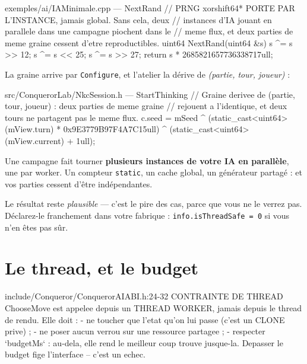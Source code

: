 \begin{nkcode}{exemples/ai/IAMinimale.cpp — NextRand}
// PRNG xorshift64* PORTE PAR L'INSTANCE, jamais global. Sans cela, deux
// instances d'IA jouant en parallele dans une campagne piochent dans le
// meme flux, et deux parties de meme graine cessent d'etre reproductibles.
uint64 NextRand(uint64 &s) {
    s ^= s >> 12;
    s ^= s << 25;
    s ^= s >> 27;
    return s * 2685821657736338717ull;
}
\end{nkcode}

La graine arrive par \texttt{Configure}, et l'atelier la dérive de
\emph{(partie, tour, joueur)} :

\begin{nkcode}{src/ConquerorLab/NkcSession.h — StartThinking}
// Graine derivee de (partie, tour, joueur) : deux parties de meme graine
// rejouent a l'identique, et deux tours ne partagent pas le meme flux.
c.seed = mSeed ^ (static_cast<uint64>(mView.turn) * 0x9E3779B97F4A7C15ull) ^
         (static_cast<uint64>(mView.current) + 1ull);
\end{nkcode}

\begin{nkpiege}
Une campagne fait tourner \textbf{plusieurs instances de votre IA en parallèle},
une par worker. Un compteur \texttt{static}, un cache global, un générateur
partagé : et vos parties cessent d'être indépendantes.

Le résultat reste \emph{plausible} — c'est le pire des cas, parce que vous ne le
verrez pas. Déclarez-le franchement dans votre fabrique :
\texttt{info.isThreadSafe = 0} si vous n'en êtes pas sûr.
\end{nkpiege}

\section{Le thread, et le budget}

\begin{nkcode}{include/Conqueror/ConquerorAIABI.h:24-32}
CONTRAINTE DE THREAD
ChooseMove est appelee depuis un THREAD WORKER, jamais depuis le thread de
rendu. Elle doit :
  - ne toucher que l'etat qu'on lui passe (c'est un CLONE prive) ;
  - ne poser aucun verrou sur une ressource partagee ;
  - respecter `budgetMs` : au-dela, elle rend le meilleur coup trouve
    jusque-la. Depasser le budget fige l'interface -- c'est un echec.
\end{nkcode}

